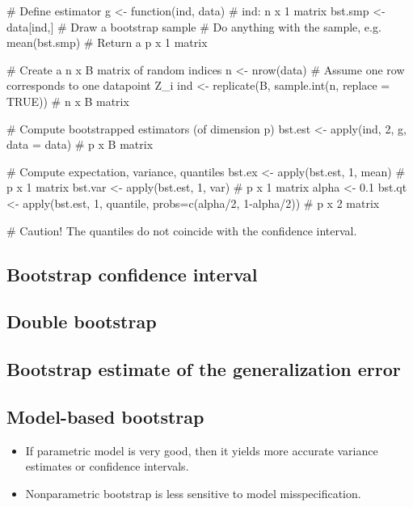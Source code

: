 \begin{code}
 # Define estimator
 g <- function(ind, data){ # ind: n x 1 matrix
    bst.smp <- data[ind,] # Draw a bootstrap sample
    # Do anything with the sample, e.g. mean(bst.smp)
    # Return a p x 1 matrix
 }
 
 # Create a n x B matrix of random indices
 n <- nrow(data) # Assume one row corresponds to one datapoint Z_i
 ind <- replicate(B, sample.int(n, replace = TRUE)) # n x B matrix
 
 # Compute bootstrapped estimators (of dimension p)
 bst.est <- apply(ind, 2, g, data = data) # p x B matrix
 
 # Compute expectation, variance, quantiles
 bst.ex  <- apply(bst.est, 1, mean) # p x 1 matrix
 bst.var <- apply(bst.est, 1, var)  # p x 1 matrix
 alpha <- 0.1
 bst.qt  <- apply(bst.est, 1, quantile, probs=c(alpha/2, 1-alpha/2)) # p x 2 matrix

 # Caution! The quantiles do not coincide with the confidence interval.
 \end{code}
 \subsection{Bootstrap confidence interval}
 
 \subsection{Double bootstrap}
 
 \subsection{Bootstrap estimate of the generalization error}
 
 \subsection{Model-based bootstrap}
 \begin{application}
 \begin{itemize}
  \item[\leftthumbsup] If parametric model is very good, then it yields more accurate variance estimates or confidence intervals.
  \item[\leftthumbsdown] Nonparametric bootstrap is less sensitive to model misspecification.
 \end{itemize}
 \end{application}
 
